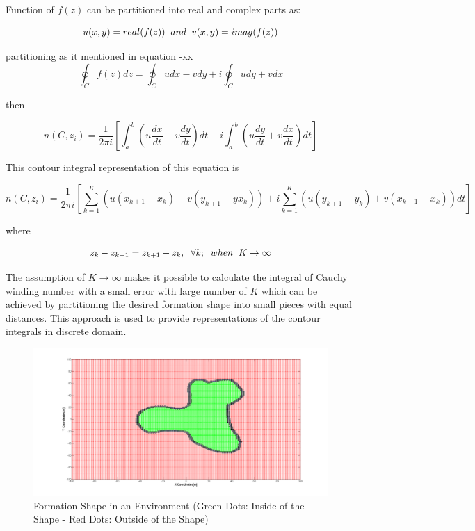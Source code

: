 Function of $f(z)$ can be partitioned into real and complex parts as:

\begin{equation}
u(x,y) = real(f(z))  \hspace{0.2cm} and \hspace{0.2cm} v(x,y) = imag(f(z))
\end{equation}
		
partitioning as it mentioned in equation -xx
\begin{equation}
\oint_C f(z)dz  = \oint_C u dx - v dy + i \oint_C u dy + v dx 
\end{equation}

then

\begin{equation}
n(C,z_i)  = \frac{1}{2\pi i} \left[\int_{a}^{b} \left(u\frac{dx}{dt} - v\frac{dy}{dt}\right)dt + i\int_{a}^{b}\left(u\frac{dy}{dt} + v\frac{dx}{dt}\right)dt\right]
\end{equation}
		
This contour integral representation of this equation is
		
\begin{equation}
n(C,z_i)  = \frac{1}{2\pi i} \left[\sum_{k=1}^{K} \left(u(x_{k+1} - x_k ) - v(y_{k+1} -yx_k )\right) + i\sum_{k=1}^{K}\left(u(y_{k+1} - y_k ) + v(x_{k+1} - x_k )\right)dt\right]
\end{equation}

where

\begin{equation}
z_k - z_{k-1} = z_{k+1} - z_k, \hspace{0.2cm}  \forall k ;  \hspace{0.2cm} when  \hspace{0.2cm} K \to\infty
\end{equation}

The assumption of $K \to\infty$ makes it possible to calculate the integral of Cauchy winding number with a small error with large number of $K$ which can be achieved by partitioning the desired formation shape  into small pieces with equal  distances. This approach is used to provide representations of the contour integrals in discrete domain. 

\begin{figure}[H]
\caption{Formation Shape in an Environment (Green Dots: Inside of the Shape - Red Dots: Outside of the Shape)}
\centering			
\includegraphics[scale = 0.30]{iceride_disarida}
\end{figure}

